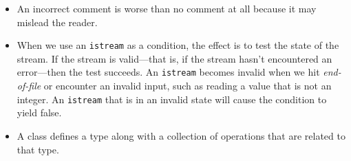 \begin{itemize}
\item An incorrect comment is worse than no comment at all because it may mislead the reader.

\item When we use an \texttt{istream} as a condition, the effect is to test the state of the stream. If the stream is valid---that is, if the stream hasn't encountered an error---then the test succeeds. An \texttt{istream} becomes invalid when we hit \textit{end-of-file} or encounter an invalid input, such as reading a value that is not an integer. An \texttt{istream} that is in an invalid state will cause the condition to yield false.

\item A class defines a type along with a collection of operations that are related to that type.

\end{itemize}